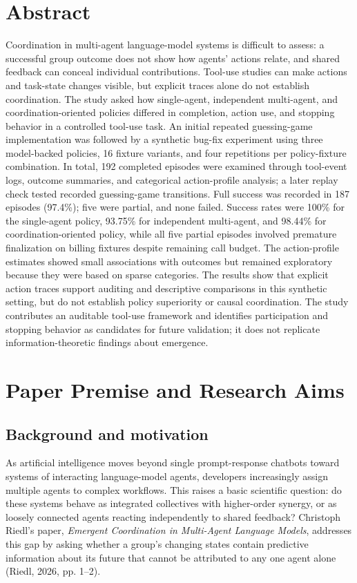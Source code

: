 \documentclass[12pt,a4paper,oneside]{report}
\begin{document}
\chapter*{Abstract}
\label{abstract}
Coordination in multi-agent language-model systems is difficult to assess: a successful group outcome does not show how agents’ actions relate, and shared feedback can conceal individual contributions. Tool-use studies can make actions and task-state changes visible, but explicit traces alone do not establish coordination. The study asked how single-agent, independent multi-agent, and coordination-oriented policies differed in completion, action use, and stopping behavior in a controlled tool-use task. An initial repeated guessing-game implementation was followed by a synthetic bug-fix experiment using three model-backed policies, 16 fixture variants, and four repetitions per policy-fixture combination. In total, 192 completed episodes were examined through tool-event logs, outcome summaries, and categorical action-profile analysis; a later replay check tested recorded guessing-game transitions. Full success was recorded in 187 episodes (97.4\%); five were partial, and none failed. Success rates were 100\% for the single-agent policy, 93.75\% for independent multi-agent, and 98.44\% for coordination-oriented policy, while all five partial episodes involved premature finalization on billing fixtures despite remaining call budget. The action-profile estimates showed small associations with outcomes but remained exploratory because they were based on sparse categories. The results show that explicit action traces support auditing and descriptive comparisons in this synthetic setting, but do not establish policy superiority or causal coordination. The study contributes an auditable tool-use framework and identifies participation and stopping behavior as candidates for future validation; it does not replicate information-theoretic findings about emergence.

\clearpage
\tableofcontents
\clearpage
\begingroup
\setlength{\parskip}{0pt}
\listoffigures
\endgroup
\clearpage
\begingroup
\setlength{\parskip}{0pt}
\listoftables
\endgroup
\clearpage\chapter{Paper Premise and Research Aims}
\label{chapter-01}
\thispagestyle{plain}
\section{Background and motivation}
As artificial intelligence moves beyond single prompt-response chatbots toward systems of interacting language-model agents, developers increasingly assign multiple agents to complex workflows. This raises a basic scientific question: do these systems behave as integrated collectives with higher-order synergy, or as loosely connected agents reacting independently to shared feedback? Christoph Riedl’s paper, \emph{Emergent Coordination in Multi-Agent Language Models}, addresses this gap by asking whether a group’s changing states contain predictive information about its future that cannot be attributed to any one agent alone (Riedl, 2026, pp. 1–2).
\end{document}
